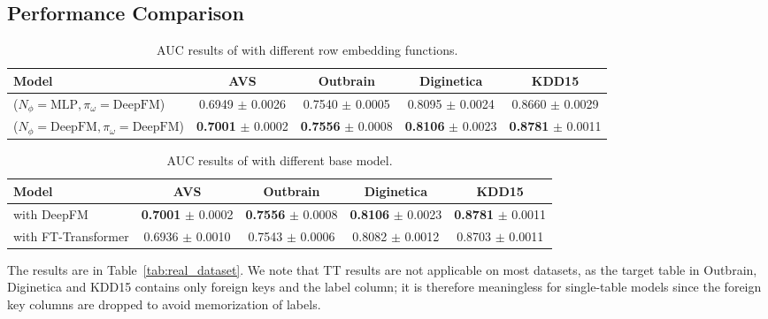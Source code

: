 \subsection{Performance Comparison}
\label{sec:performance-comparison}
\begin{table*}[ht]
    \caption{AUC results of \model{} with different row embedding functions.}
    \centering
    \renewcommand\arraystretch{1.25}
    \begin{tabular}{l|c|c|c|c}
        \toprule
        Model & \textbf{AVS} & \textbf{Outbrain} & \textbf{Diginetica} & \textbf{KDD15}\\
        \midrule
        \model{} ($N_\phi=\text{MLP},\pi_\omega=\text{DeepFM}$) & 0.6949 $\pm$ 0.0026 & 0.7540 $\pm$ 0.0005 & 0.8095 $\pm$ 0.0024 & 0.8660 $\pm$ 0.0029\\
        \model{} ($N_\phi=\text{DeepFM},\pi_\omega=\text{DeepFM}$)     & \textbf{0.7001} $\pm$ 0.0002 & \textbf{0.7556} $\pm$ 0.0008 & \textbf{0.8106} $\pm$ 0.0023 & \textbf{0.8781} $\pm$ 0.0011\\
        \bottomrule
    \end{tabular}
    \label{tab:row_embedding_ablation}
\end{table*}

\begin{table*}[ht]
    \caption{AUC results of \model{} with different base model.}
    \centering
    \renewcommand\arraystretch{1.25}
    \begin{tabular}{l|c|c|c|c}
        \toprule
        Model & \textbf{AVS} & \textbf{Outbrain} & \textbf{Diginetica} & \textbf{KDD15}\\
        \midrule
        \model{} with DeepFM & \textbf{0.7001} $\pm$ 0.0002 & \textbf{0.7556} $\pm$ 0.0008 & \textbf{0.8106} $\pm$ 0.0023 & \textbf{0.8781} $\pm$ 0.0011\\
        \model{} with FT-Transformer & 0.6936 $\pm$ 0.0010 & 0.7543 $\pm$ 0.0006 & 0.8082 $\pm$ 0.0012 & 0.8703 $\pm$ 0.0011 \\
        \bottomrule
    \end{tabular}
    \label{tab:base_model_ablation}
\end{table*}

The results are in Table~\ref{tab:real_dataset}.  We note that
TT results are not applicable on most datasets, as the target table in Outbrain, Diginetica and KDD15 contains only foreign keys and the label column; it is therefore meaningless for single-table models since the foreign key columns are dropped to avoid memorization of labels.

